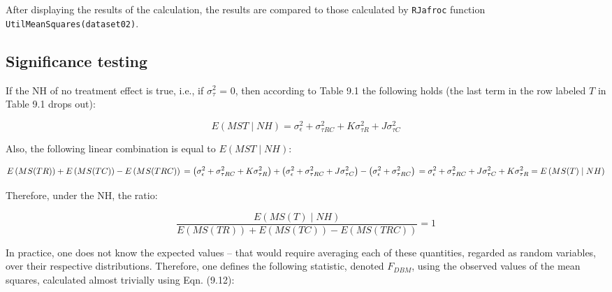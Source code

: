 \documentclass[
]{book}
\begin{document}
After displaying the results of the calculation, the results are compared to those calculated by \texttt{RJafroc} function \texttt{UtilMeanSquares(dataset02)}.

\hypertarget{significance-testing}{%
\subsection{Significance testing}\label{significance-testing}}

If the NH of no treatment effect is true, i.e., if \(\sigma_{\tau}^{2}\) = 0, then according to Table 9.1 the following holds (the last term in the row labeled \(T\) in Table 9.1 drops out):

\begin{equation}
E\left ( MST\mid NH \right ) = \sigma_{\epsilon}^{2} + \sigma_{\tau RC}^{2} + K\sigma_{\tau R}^{2} + J\sigma_{\tau C}^{2}
\label{eq:ExpValMST}
\end{equation}

Also, the following linear combination is equal to \(E\left ( MST\mid NH \right )\):

\begin{equation}
E\left ( MS(TR) \right ) + E\left ( MS(TC) \right )  - E\left ( MS(TRC) \right ) \\ 
= \left (\sigma_{\epsilon}^{2} + \sigma_{\tau RC}^{2} + K\sigma_{\tau R}^{2} \right ) + \left (\sigma_{\epsilon}^{2} + \sigma_{\tau RC}^{2} + J\sigma_{\tau C}^{2} \right ) -\left (\sigma_{\epsilon}^{2} + \sigma_{\tau RC}^{2}  \right ) \\
= \sigma_{\epsilon}^{2} + \sigma_{\tau RC}^{2} + J \sigma_{\tau C}^{2} +  K\sigma_{\tau R}^{2} \\
= E\left ( MS(T)\mid NH \right )
\label{eq:linearComb}
\end{equation}

Therefore, under the NH, the ratio:

\begin{equation}
\frac{E\left ( MS(T)\mid NH \right )}{E\left ( MS(TR) \right ) + E\left ( MS(TC) \right )  - E\left ( MS(TRC) \right )} = 1
\label{eq:ConstrFRatio}
\end{equation}

In practice, one does not know the expected values -- that would require averaging each of these quantities, regarded as random variables, over their respective distributions. Therefore, one defines the following statistic, denoted \(F_{DBM}\), using the observed values of the mean squares, calculated almost trivially using Eqn. (9.12):
\end{document}
